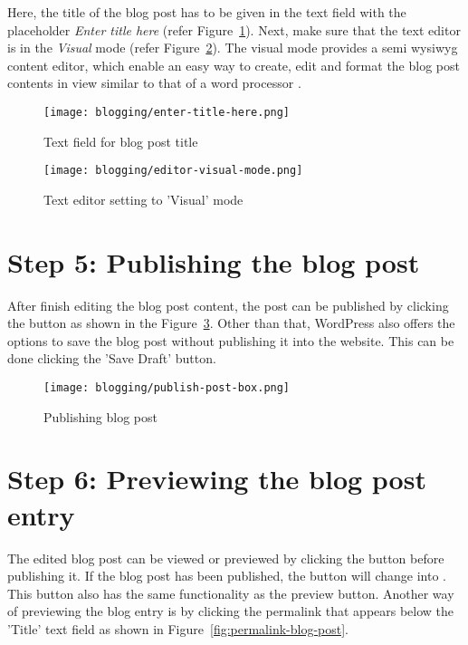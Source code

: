 Here, the title of the blog post has to be given in the text field with the placeholder \emph{Enter title here} (refer Figure~\ref{fig:enter-title-here}). Next, make sure that the text editor is in the \emph{Visual} mode (refer Figure~\ref{fig:editor-visual-mode}). The visual mode provides a semi \ac{wysiwyg} content editor, which enable an easy way to create, edit and format the blog post contents in view similar to that of a word processor \cite{wordpress-editor}.

\begin{figure}[ht]
\caption{Text field for blog post title}
\label{fig:enter-title-here}
\centering
\texttt{[image: blogging/enter-title-here.png]}
\end{figure}

\begin{figure}[ht]
\caption{Text editor setting to 'Visual' mode}
\label{fig:editor-visual-mode}
\centering
\texttt{[image: blogging/editor-visual-mode.png]}
\end{figure}

\section*{Step 5: Publishing the blog post}
After finish editing the blog post content, the post can be published by clicking the   button as shown in the Figure~\ref{fig:publish-post-box}. Other than that, WordPress also offers the options to save the blog post without publishing it into the website. This can be done clicking the 'Save Draft' button.

\begin{figure}[ht]
\caption{Publishing blog post}
\label{fig:publish-post-box}
\centering
\texttt{[image: blogging/publish-post-box.png]}
\end{figure}

\section*{Step 6: Previewing the blog post entry}
The edited blog post can be viewed or previewed by clicking the  button before publishing it. If the blog post has been published, the button will change into . This button also has the same functionality as the preview button. Another way of previewing the blog entry is by clicking the permalink that appears below the 'Title' text field as shown in Figure~\ref{fig:permalink-blog-post}.

